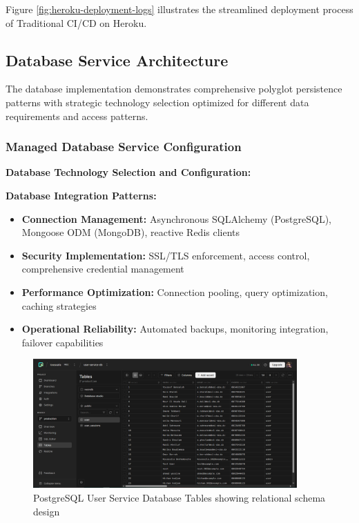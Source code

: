 Figure \ref{fig:heroku-deployment-logs} illustrates the streamlined deployment process of Traditional CI/CD on Heroku.

\subsection{Database Service Architecture}

The database implementation demonstrates comprehensive polyglot persistence patterns with strategic technology selection optimized for different data requirements and access patterns.

\subsubsection{Managed Database Service Configuration}

\textbf{Database Technology Selection and Configuration:}



\textbf{Database Integration Patterns:}
\begin{itemize}
\item \textbf{Connection Management:} Asynchronous SQLAlchemy (PostgreSQL), Mongoose ODM (MongoDB), reactive Redis clients
\item \textbf{Security Implementation:} SSL/TLS enforcement, access control, comprehensive credential management
\item \textbf{Performance Optimization:} Connection pooling, query optimization, caching strategies
\item \textbf{Operational Reliability:} Automated backups, monitoring integration, failover capabilities
\end{itemize}

\begin{figure}[H]
\centering
\includegraphics[width=0.9\textwidth]{figures/chapter5/postgresql-database-user-tables.png}
\caption{PostgreSQL User Service Database Tables showing relational schema design}
\label{fig:postgresql-user-tables}
\end{figure}

